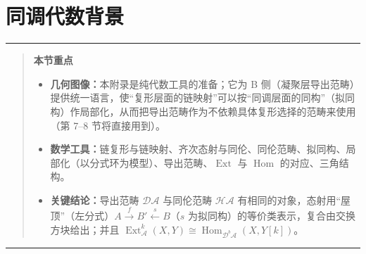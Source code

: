 \documentclass[11pt,a4paper]{article}
\theoremstyle{plain}
\theoremstyle{definition}
\newenvironment{keytakeaways}[1][本节重点]{%
  \par\addvspace{9pt}%
  \noindent\rule{\linewidth}{0.7pt}\par\nobreak
  \begin{quote}\noindent\textbf{#1}\par\small
}{%
  \end{quote}%
  \noindent\rule{\linewidth}{0.7pt}\par\addvspace{7pt}%
}
\begin{document}



\appendix

\section{同调代数背景}

\begin{keytakeaways}
\begin{itemize}[leftmargin=1.6em,itemsep=1pt,topsep=2pt]
  \item \textbf{几何图像：}本附录是纯代数工具的准备；它为 B 侧（凝聚层导出范畴）提供统一语言，使“复形层面的链映射”可以按“同调层面的同构”（拟同构）作局部化，从而把导出范畴作为不依赖具体复形选择的范畴来使用（第 7--8 节将直接用到）。
  \item \textbf{数学工具：}链复形与链映射、齐次态射与同伦、同伦范畴、拟同构、局部化（以分式环为模型）、导出范畴、$\operatorname{Ext}$ 与 $\operatorname{Hom}$ 的对应、三角结构。
  \item \textbf{关键结论：}导出范畴 $\mathcal{D}\mathcal{A}$ 与同伦范畴 $\mathcal{H}\mathcal{A}$ 有相同的对象，态射用“屋顶”（左分式）$A\xrightarrow{f}B'\xleftarrow{s}B$（$s$ 为拟同构）的等价类表示，复合由交换方块给出；并且 $\operatorname{Ext}^k_{\mathcal{A}}(X,Y)\cong\operatorname{Hom}_{\mathcal{D}^b\mathcal{A}}(X,Y[k])$。
\end{itemize}
\end{keytakeaways}
\end{document}
